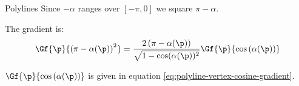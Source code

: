 \begin{plSection}{Polylines}
Since $-\alpha$ ranges over $[-\pi,0]$
we square $\pi - \alpha$.

The gradient is:
\begin{equation}
\Gf{\p}{\left( \pi - \alpha(\p) \right)^2}
=
{{2 \left( \pi - \alpha(\p) \right)}
\over
{\sqrt{ 1 - \cos(\alpha(\p))^2}}}
\Gf{\p}{\cos\left(\alpha(\p)\right)}
\end{equation}

$\Gf{\p}{\cos \left( \alpha(\p) \right)}$ is given
in equation \ref{eq:polyline-vertex-cosine-gradient}.

\end{plSection}%
